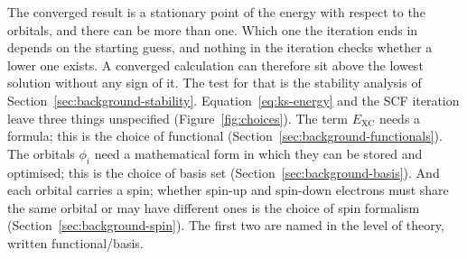 The converged result is a stationary point of the energy with respect
to the orbitals, and there can be more than one. Which one the
iteration ends in depends on the starting guess, and nothing in the
iteration checks whether a lower one exists. A converged calculation
can therefore sit above the lowest solution without any sign of it.
The test for that is the stability analysis of
Section~\ref{sec:background-stability}.
Equation~\eqref{eq:ks-energy} and the SCF iteration leave three things
unspecified (Figure~\ref{fig:choices}). The term $E_\text{XC}$ needs a formula; this is the choice of
functional (Section~\ref{sec:background-functionals}). The orbitals
$\phi_i$ need a mathematical form in which they can be stored and
optimised; this is the choice of basis set
(Section~\ref{sec:background-basis}). And each orbital carries a spin;
whether spin-up and spin-down electrons must share the same orbital or may
have different ones is the choice of spin formalism
(Section~\ref{sec:background-spin}). The first two are named in the level
of theory, written functional/basis. 

